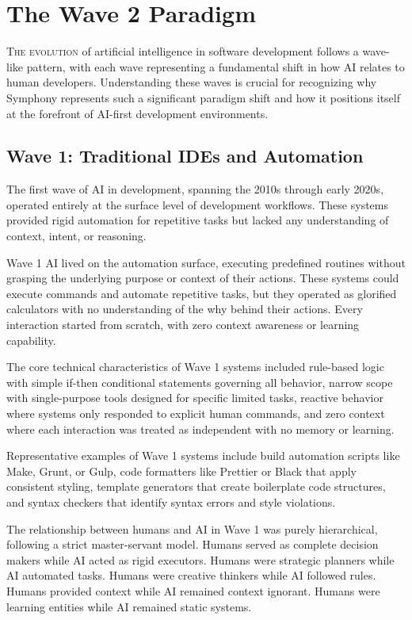 
\section{The Wave 2 Paradigm}
\label{sec:wave2-paradigm}

\lettrine{T}{he evolution} of artificial intelligence in software development follows a wave-like pattern, with each wave representing a fundamental shift in how AI relates to human developers. Understanding these waves is crucial for recognizing why Symphony represents such a significant paradigm shift and how it positions itself at the forefront of AI-first development environments.

\subsection{Wave 1: Traditional IDEs and Automation}

The first wave of AI in development, spanning the 2010s through early 2020s, operated entirely at the surface level of development workflows. These systems provided rigid automation for repetitive tasks but lacked any understanding of context, intent, or reasoning.

Wave 1 AI lived on the automation surface, executing predefined routines without grasping the underlying purpose or context of their actions. These systems could execute commands and automate repetitive tasks, but they operated as glorified calculators with no understanding of the why behind their actions. Every interaction started from scratch, with zero context awareness or learning capability.

The core technical characteristics of Wave 1 systems included rule-based logic with simple if-then conditional statements governing all behavior, narrow scope with single-purpose tools designed for specific limited tasks, reactive behavior where systems only responded to explicit human commands, and zero context where each interaction was treated as independent with no memory or learning.

Representative examples of Wave 1 systems include build automation scripts like Make, Grunt, or Gulp, code formatters like Prettier or Black that apply consistent styling, template generators that create boilerplate code structures, and syntax checkers that identify syntax errors and style violations.

The relationship between humans and AI in Wave 1 was purely hierarchical, following a strict master-servant model. Humans served as complete decision makers while AI acted as rigid executors. Humans were strategic planners while AI automated tasks. Humans were creative thinkers while AI followed rules. Humans provided context while AI remained context ignorant. Humans were learning entities while AI remained static systems.

